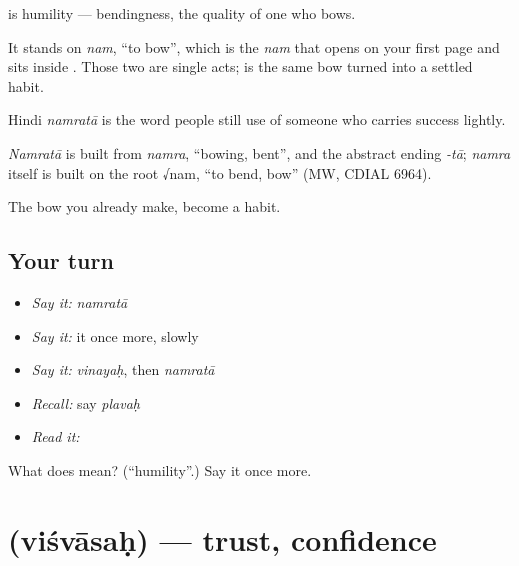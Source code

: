 \textbf{} is humility — bendingness, the quality of one who bows.

It stands on \emph{nam}, \textquotedblleft{}to bow\textquotedblright{}, which is the \emph{nam} that opens  on your first page and sits inside . Those two are single acts; \textbf{} is the same bow turned into a settled habit.

Hindi \emph{namratā} is the word people still use of someone who carries success lightly.

\begin{cousinweb}
\emph{Namratā} is built from \emph{namra}, \textquotedblleft{}bowing, bent\textquotedblright{}, and the abstract ending \emph{-tā}; \emph{namra} itself is built on the root √nam, \textquotedblleft{}to bend, bow\textquotedblright{} (MW, CDIAL 6964).
\end{cousinweb}

\begin{grammarlens}[title={What you've built}]
The bow you already make, become a habit.
\end{grammarlens}

\subsection*{Your turn}
\begin{itemize}
\raggedright
  \item \emph{Say it:} \emph{namratā}
  \item \emph{Say it:} it once more, slowly
  \item \emph{Say it:} \emph{vinayaḥ}, then \emph{namratā}
  \item \emph{Recall:} say \emph{plavaḥ}
  \item \emph{Read it:} \textbf{}
\end{itemize}

\begin{tcolorbox}[breakable,colback=teal!4,colframe=teal!35!black,title={Before you move on}]
What does  mean? (\textquotedblleft{}humility\textquotedblright{}.) Say it once more.
\end{tcolorbox}
\section[\texorpdfstring{\sk{विश्वासः} (viśvāsaḥ)}{विश्वासः (viśvāsaḥ)}]{ (viśvāsaḥ) — trust, confidence}

\label{lesson:SA-C43-trust}



